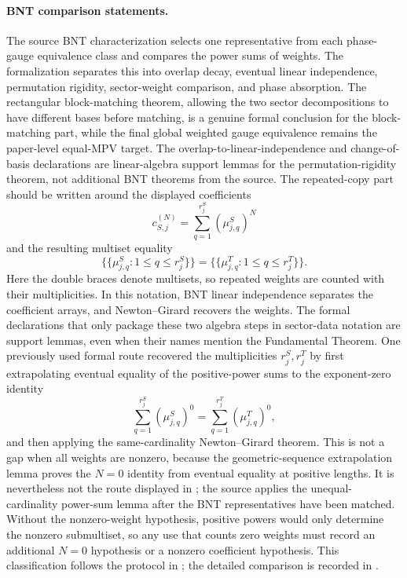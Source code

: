 \documentclass{article}
\begin{document}
\paragraph{BNT comparison statements.}
The source BNT characterization selects one representative from each
phase-gauge equivalence class and compares the power sums of weights. The
formalization separates this into overlap decay, eventual linear independence,
permutation rigidity, sector-weight comparison, and phase absorption. The
rectangular block-matching theorem, allowing the two sector decompositions to
have different bases before matching, is a genuine formal conclusion for the
block-matching part, while the final global weighted gauge equivalence remains
the paper-level equal-MPV target.
The overlap-to-linear-independence and change-of-basis declarations are
linear-algebra support lemmas for the permutation-rigidity theorem, not
additional BNT theorems from the source.
The repeated-copy part should be written around the displayed coefficients
\[
  c_{S,j}^{(N)}=\sum_{q=1}^{r_j^S}(\mu^S_{j,q})^N
\]
and the resulting multiset equality
\[
  \{\!\{\mu^S_{j,q}:1\le q\le r_j^S\}\!\}
  =
  \{\!\{\mu^T_{j,q}:1\le q\le r_j^T\}\!\}.
\]
Here the double braces denote multisets, so repeated weights are counted with
their multiplicities.
In this notation, BNT linear independence separates the coefficient arrays, and
Newton--Girard recovers the weights. The formal declarations that only package
these two algebra steps in sector-data notation are support lemmas, even when
their names mention the Fundamental Theorem.
One previously used formal route recovered the multiplicities $r_j^S,r_j^T$
by first extrapolating eventual equality of the positive-power sums to the
exponent-zero identity
\[
  \sum_{q=1}^{r_j^S}(\mu^S_{j,q})^0
  =
  \sum_{q=1}^{r_j^T}(\mu^T_{j,q})^0,
\]
and then applying the same-cardinality Newton--Girard theorem. This is not a
gap when all weights are nonzero, because the geometric-sequence extrapolation
lemma proves the $N=0$ identity from eventual equality at positive lengths.
It is nevertheless not the route displayed in
\cite[Lemma~\texttt{Lem:app\_simple}, lines~1155--1163]{Cirac2016MPDO_arXiv};
the source applies the unequal-cardinality power-sum lemma after the BNT
representatives have been matched. Without the nonzero-weight hypothesis,
positive powers would only determine the nonzero submultiset, so any use that
counts zero weights must record an additional $N=0$ hypothesis or a nonzero
coefficient hypothesis.
This classification follows the protocol in
; the detailed comparison is recorded in
.
\end{document}
